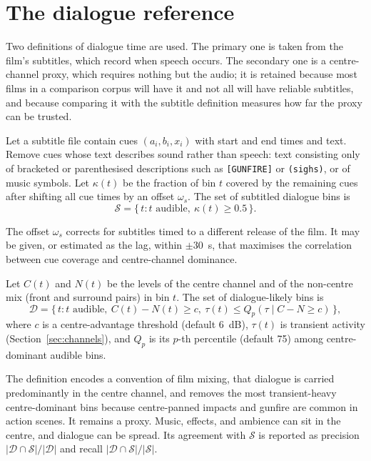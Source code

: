\section{The dialogue reference}

Two definitions of dialogue time are used. The primary one is taken from the film's subtitles, which record when speech occurs. The secondary one is a centre-channel proxy, which requires nothing but the audio; it is retained because most films in a comparison corpus will have it and not all will have reliable subtitles, and because comparing it with the subtitle definition measures how far the proxy can be trusted.

\begin{definition}
Let a subtitle file contain cues $(a_i, b_i, x_i)$ with start and end times and text. Remove cues whose text describes sound rather than speech: text consisting only of bracketed or parenthesised descriptions such as \texttt{[GUNFIRE]} or \texttt{(sighs)}, or of music symbols. Let $\kappa(t)$ be the fraction of bin $t$ covered by the remaining cues after shifting all cue times by an offset $\omega_s$. The set of subtitled dialogue bins is
\begin{equation}
\mathcal{S} = \{\, t : t \text{ audible},\ \kappa(t) \ge 0.5 \,\}.
\end{equation}
\end{definition}

The offset $\omega_s$ corrects for subtitles timed to a different release of the film. It may be given, or estimated as the lag, within $\pm30$~s, that maximises the correlation between cue coverage and centre-channel dominance.

\begin{definition}
Let $C(t)$ and $N(t)$ be the levels of the centre channel and of the non-centre mix (front and surround pairs) in bin $t$. The set of dialogue-likely bins is
\begin{equation}
\mathcal{D} = \{\, t : t \text{ audible},\ C(t) - N(t) \ge c,\ \tau(t) \le Q_{p}(\tau \mid C - N \ge c) \,\},
\end{equation}
where $c$ is a centre-advantage threshold (default 6~dB), $\tau(t)$ is transient activity (Section~\ref{sec:channels}), and $Q_p$ is its $p$-th percentile (default 75) among centre-dominant audible bins.
\end{definition}

The definition encodes a convention of film mixing, that dialogue is carried predominantly in the centre channel, and removes the most transient-heavy centre-dominant bins because centre-panned impacts and gunfire are common in action scenes. It remains a proxy. Music, effects, and ambience can sit in the centre, and dialogue can be spread. Its agreement with $\mathcal{S}$ is reported as precision $|\mathcal{D}\cap\mathcal{S}|/|\mathcal{D}|$ and recall $|\mathcal{D}\cap\mathcal{S}|/|\mathcal{S}|$.

